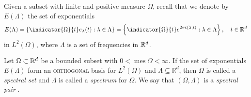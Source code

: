 \documentclass[../thesis.tex]{subfiles}
\begin{document}






Given a subset with finite and positive measure $\Omega$, recall that we denote by $E(\Lambda)$ the set of exponentials
\begin{align}\label{eq:exp_set_all_d}
    E(\Lambda) = \braqMed{\indicator{\Omega}{t} e_\lambda(t) : \lambda \in \Lambda} = \braqMed{\indicator{\Omega}{t} e^{2 \pi i \inpl{t}} : \lambda \in \Lambda}, \quad t\in \R^d%
\end{align}
in $L^2(\Omega)$, where $\Lambda$ is a set of frequencies in $\mathbb{R}^d$.
\begin{definition} \label{def:spectral_set} 
    Let $\Omega \subset \mathbb{R}^d$ be a bounded subset with $0< \operatorname{mes} \Omega < \infty$. If the set of exponentials $E(\Lambda)$ form an \textsc{orthogonal} basis for $L^2 (\Omega)$ and $\Lambda \subseteq \mathbb{R}^d$, then $\Omega$ is called a \emph{spectral set} and $\Lambda$ is called a \emph{spectrum} for $\Omega$. We say that $(\Omega, \Lambda)$ is a \emph{spectral pair} \cite{liuUniformityNonUniformGabor2003}.
\end{definition}
\end{document}
